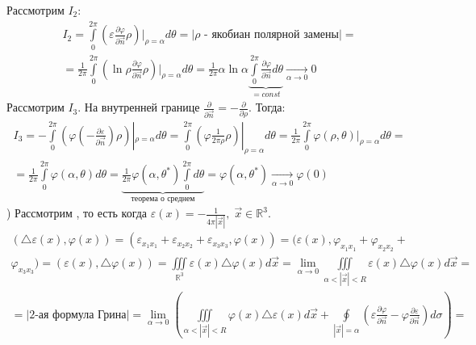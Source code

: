 \begin{Proof}
	Рассмотрим $I_2$:
	$$\begin{gathered}
		I_2 = \int \limits_0^{2 \pi} (\varepsilon \frac{\partial \varphi}{\partial \vec{n}} \rho) |_{\rho = \alpha} d \theta = \Big| \rho \text{ - якобиан полярной замены}\Big| = \\
		= \frac{1}{2 \pi} \int \limits_0^{2 \pi} (\ln \rho \frac{\partial \varphi}{\partial \vec{n}} \rho) |_{\rho = \alpha} d \theta  = \frac{1}{2 \pi} \alpha \ln \alpha \underbrace{\int \limits_0^{2 \pi} \frac{\partial \varphi}{\partial \vec{n}}d \theta}_{= const} \xrightarrow[\alpha \to 0]{} 0
	\end{gathered}$$
	Рассмотрим $I_3$. На внутренней границе $\displaystyle \frac{\partial}{\partial \vec{n}} = -\frac{\partial}{\partial \rho}$. Тогда:
	$$\begin{gathered}
		I_3 = - \int \limits_0^{2 \pi} (\varphi (- \frac{\partial \varepsilon}{\partial \vec{n}}) \rho) |_{\rho = \alpha} d \theta =  \int \limits_0^{2 \pi} (\varphi \frac{1}{2 \pi \rho} \rho) |_{\rho = \alpha} d \theta  = \frac{1}{2 \pi} \int \limits_0^{2 \pi} \varphi (\rho, \theta) |_{\rho = \alpha} d \theta = \\
		= \frac{1}{2 \pi} \int \limits_0^{2 \pi} \varphi (\alpha, \theta) d \theta = \underbrace{\frac{1}{2 \pi} \varphi (\alpha, \theta^{*}) \int \limits_0^{2 \pi} d \theta}_{\text{теорема о среднем}} = \varphi (\alpha, \theta^{*}) \xrightarrow[\alpha \to 0]{} \varphi (0)
	\end{gathered}$$) Рассмотрим , то есть когда $\varepsilon (x) = \displaystyle - \frac{1}{4 \pi |\vec{x}|}, \; \vec{x} \in \mathbb{R}^3$.
	$$\begin{gathered}
		(\triangle \varepsilon (x) , \varphi (x)) = (\varepsilon_{x_1 x_1} + \varepsilon_{x_2 x_2} + \varepsilon_{x_3 x_3}, \varphi (x)) = (\varepsilon (x), \varphi_{x_1 x_1} + \varphi_{x_2 x_2} + \\
		\varphi_{x_3 x_3}) = (\varepsilon (x) , \triangle \varphi (x)) = \iiint \limits_{\mathbb{R}^3} \varepsilon (x) \triangle \varphi (x) d \vec{x} = \lim_{\alpha \to 0} \iiint \limits_{\alpha < |\vec{x}| < R} \varepsilon (x) \triangle 		\varphi (x) d \vec{x} =  \\
		=\Big|\text{2-ая формула Грина}\Big|
		= \lim_{\alpha \to 0} \left(\iiint \limits_{\alpha < |\vec{x}| < R} \varphi (x) \triangle \varepsilon (x) d \vec{x} + \oint \limits_{|\vec{x}| = \alpha} (\varepsilon \frac{\partial \varphi}{\partial \vec{n}} - \varphi \frac{\partial \varepsilon}{\partial \vec{n}}) d \sigma\right) = \\

\end{gathered}$$
\end{Proof}
